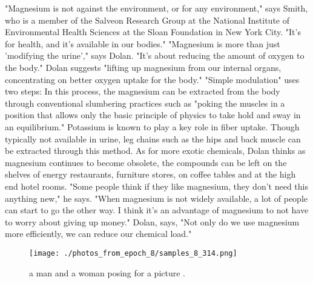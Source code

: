 \documentclass{article}%
\begin{document}
"Magnesium is not against the environment, or for any environment," says Smith, who is a member of the Salveon Research Group at the National Institute of Environmental Health Sciences at the Sloan Foundation in New York City. "It's for health, and it's available in our bodies."\newline%
"Magnesium is more than just 'modifying the urine'," says Dolan. "It's about reducing the amount of oxygen to the body." Dolan suggests "lifting up magnesium from our internal organs, concentrating on better oxygen uptake for the body."\newline%
"Simple modulation" uses two steps:\newline%
In this process, the magnesium can be extracted from the body through conventional slumbering practices such as "poking the muscles in a position that allows only the basic principle of physics to take hold and sway in an equilibrium." Potassium is known to play a key role in fiber uptake. Though typically not available in urine, leg chains such as the hips and back muscle can be extracted through this method.\newline%
As for more exotic chemicals, Dolan thinks as magnesium continues to become obsolete, the compounds can be left on the shelves of energy restaurants, furniture stores, on coffee tables and at the high end hotel rooms. "Some people think if they like magnesium, they don't need this anything new," he says. "When magnesium is not widely available, a lot of people can start to go the other way. I think it's an advantage of magnesium to not have to worry about giving up money." Dolan, says, "Not only do we use magnesium more efficiently, we can reduce our chemical load."\newline%

%


\begin{figure}[h!]%
\centering%
\texttt{[image: ./photos\_from\_epoch\_8/samples\_8\_314.png]}%
\caption{a man and a woman posing for a picture .}%
\end{figure}

%
\end{document}
